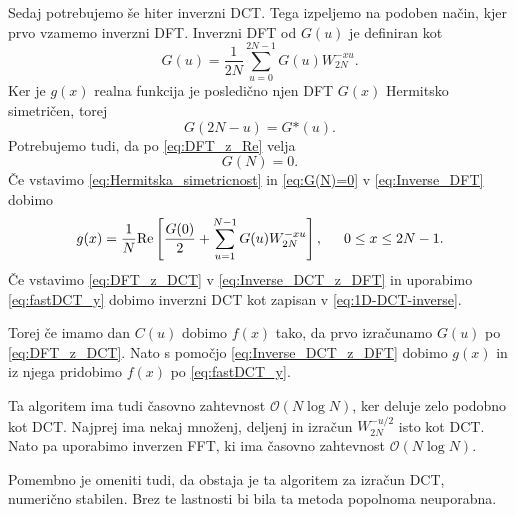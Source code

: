 \documentclass[a4paper,12pt,openright]{book}
\begin{document}
Sedaj potrebujemo še hiter inverzni DCT. Tega izpeljemo na podoben način, kjer prvo vzamemo inverzni DFT. Inverzni DFT od $G(u)$ je definiran kot 
\begin{equation}
  G(u) = \frac{1}{2N}\sum_{u=0}^{2N-1} G(u) W_{2N}^{-xu}.
\label{eq:Inverse_DFT}
\end{equation}
Ker je $g(x)$ realna funkcija je posledično njen DFT $G(x)$ Hermitsko simetričen, torej
\begin{equation}
  G(2N - u) = G\text{*}(u).
\label{eq:Hermitska_simetricnost}
\end{equation}
Potrebujemo tudi, da po \eqref{eq:DFT_z_Re} velja
\begin{equation}
  G(N) = 0.
\label{eq:G(N)=0}
\end{equation}
Če vstavimo \eqref{eq:Hermitska_simetricnost} in \eqref{eq:G(N)=0} v \eqref{eq:Inverse_DFT} dobimo 
\begin{equation}
  g(x) = \frac{1}{N}\mbox{Re}\left[ \frac{G(0)}{2} + \sum_{u=1}^{N-1} G(u) W_{2N}^{-xu}   \right], \indent 0 \leq x \leq 2N-1.
\label{eq:Inverse_DCT_z_DFT}
\end{equation}
Če vstavimo \eqref{eq:DFT_z_DCT} v \eqref{eq:Inverse_DCT_z_DFT} in uporabimo \eqref{eq:fastDCT_y} dobimo inverzni DCT kot zapisan v \eqref{eq:1D-DCT-inverse}.\par
Torej če imamo dan $C(u)$ dobimo $f(x)$ tako, da prvo izračunamo $G(u)$ po \eqref{eq:DFT_z_DCT}. Nato s pomočjo \eqref{eq:Inverse_DCT_z_DFT} dobimo $g(x)$ in iz njega pridobimo $f(x)$ po \eqref{eq:fastDCT_y}.\par
Ta algoritem ima tudi časovno zahtevnost $\mathcal{O}(N\log{}N)$, ker deluje zelo podobno kot DCT. Najprej ima nekaj množenj, deljenj in izračun $W_{2N}^{-u/2}$ isto kot DCT. Nato pa uporabimo inverzen FFT, ki ima časovno zahtevnost $\mathcal{O}(N\log{}N)$.\par
Pomembno je omeniti tudi, da obstaja je ta algoritem za izračun DCT, numerično stabilen. Brez te lastnosti bi bila ta metoda popolnoma neuporabna.
\end{document}
